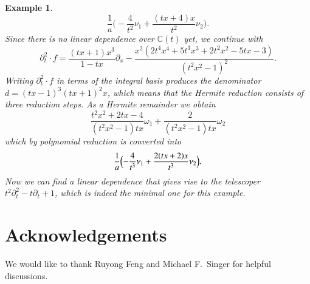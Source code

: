 \documentclass[final,1p,times,authoryear]{elsarticle}
\newtheorem{example}[theorem]{Example}
\newcommand{\bC}{ {\mathbb C}}
\begin{document}
\begin{example}
\[
  \frac1a \biggl( -\frac{4}{t^2} \nu_1 + \frac{(tx+4)x}{t^2} \nu_2 \biggr).
\]
Since there is no linear dependence over $\bC(t)$ yet, we continue with
\[
  \partial_t^2\cdot f =
  \frac{(tx+1)x^3}{1-tx} \partial_x -
  \frac{x^2(2t^4x^4+5t^3x^3+2t^2x^2-5tx-3)}{(t^2x^2-1)^2}.
\]
Writing $\partial_t^2\cdot f$ in terms of the integral basis produces the denominator
$d=(tx-1)^3(tx+1)^2x$, which means that the Hermite reduction consists of three
reduction steps. As a Hermite remainder we obtain
\[
  \frac{t^2x^2+2tx-4}{(t^2x^2-1)tx} \omega_1 + \frac{2}{(t^2x^2-1)tx} \omega_2
\]
which by polynomial reduction is converted into
\[
  \frac1a \Bigl( -\frac{4}{t^3} \nu_1 + \frac{2(tx+2)x}{t^3} \nu_2 \Bigr).
\]
Now we can find a linear dependence that gives rise to the telescoper
$t^2\partial_t^2-t\partial_t+1$, which is indeed the minimal one for this example.
\end{example}

\section*{Acknowledgements}

We would like to thank Ruyong Feng and Michael F.\ Singer for helpful discussions.



\end{document}
